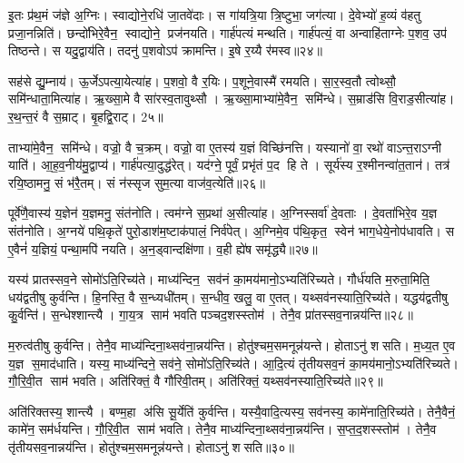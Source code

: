 इ॒तः प्र॑थ॒मं ज॑ज्ञे अ॒ग्निः। स्वाद्योने॒रधि॑ जा॒तवे॑दाः। स गा॑यत्रि॒या त्रि॒ष्टुभा॒ जग॑त्या। दे॒वेभ्यो॑ ह॒व्यं व॑हतु प्रजा॒नन्निति॑। छन्दो॑भिरे॒वैन॒ स्वाद्योने॒ प्रज॑नयति। गार्\mbox{}ह॑पत्यं मन्थति। गार्\mbox{}ह॑पत्यं॒ वा अन्वाहि॑ताग्नेः प॒शव॒ उप॑ तिष्ठन्ते। स यदु॒द्वाय॑ति। तदनु॑ प॒शवोऽप॑ क्रामन्ति। इ॒षे र॒य्यै र॑मस्व॥२४॥

सह॑से द्यु॒म्नाय॑। ऊ॒र्जेऽपत्या॒येत्या॑ह। प॒शवो॒ वै र॒यिः। प॒शूने॒वास्मै॑ रमयति। सा॒र॒स्व॒तौ त्वोथ्सौ॒ समि॑न्धाता॒मित्या॑ह। ऋ॒ख्सा॒मे वै सा॑रस्व॒तावुथ्सौ। ऋ॒ख्सा॒माभ्या॑मे॒वैन॒ समि॑न्धे। स॒म्राड॑सि वि॒राड॒सीत्या॑ह। र॒थ॒न्त॒रं वै स॒म्राट्। बृ॒हद्वि॒राट्। 2५॥

ताभ्या॑मे॒वैन॒ समि॑न्धे। वज्रो॒ वै च॒क्रम्। वज्रो॒ वा ए॒तस्य॑ य॒ज्ञं विच्छि॑नत्ति। यस्यानो॑ वा॒ रथो॑ वाऽन्त॒राऽग्नी याति॑। आ॒ह॒व॒नीय॑मु॒द्वाप्य॑। गार्\mbox{}ह॑पत्या॒दुद्ध॑रेत्। यद॑ग्ने॒ पूर्वं॒ प्रभृ॑तं प॒द हि ते। सूर्य॑स्य र॒श्मीनन्वा॑त॒तान॑। तत्र॑ रयि॒ष्ठामनु॒ सं भ॑रै॒तम्। सं न॑स्सृज सुम॒त्या वाज॑व॒त्येति॑॥२६॥

पूर्वे॑णै॒वास्य॑ य॒ज्ञेन॑ य॒ज्ञमनु॒ संत॑नोति। त्वम॑ग्ने स॒प्रथा॑ अ॒सीत्या॑ह। अ॒ग्निस्सर्वा॑ दे॒वताः। दे॒वता॑भिरे॒व य॒ज्ञ संत॑नोति। अ॒ग्नये॑ पथि॒कृते॑ पुरो॒डाश॑म॒ष्टाक॑पालं॒ निर्व॑पेत्। अ॒ग्निमे॒व प॑थि॒कृत॒ स्वेन॑ भाग॒धेये॒नोप॑धावति। स ए॒वैनं॑ य॒ज्ञियं॒ पन्था॒मपि॑ नयति। अ॒न॒ड्वान्दक्षि॑णा। व॒ही ह्ये॑ष समृ॑द्ध्यै॥२७॥

यस्य॑ प्रातस्सव॒ने सोमो॑ऽति॒रिच्य॑ते। माध्य॑न्दिन॒ सव॑नं का॒मय॑मानो॒ऽभ्यति॑रिच्यते। गौर्ध॑यति म॒रुता॒मिति॒ धय॑द्वतीषु कुर्वन्ति। हि॒नस्ति॒ वै स॒न्ध्यधी॑तम्। स॒न्धीव॒ खलु॒ वा ए॒तत्। यथ्सव॑नस्याति॒रिच्य॑ते। यद्धय॑द्वतीषु कु॒र्वन्ति॑। स॒न्धेश्शान्त्यै। गा॒य॒त्र साम॑ भवति पञ्चद॒शस्स्तोम॑। तेनै॒व प्रा॑तस्सव॒नान्नय॑न्ति॥२८॥

म॒रुत्व॑तीषु कुर्वन्ति। तेनै॒व माध्य॑न्दिना॒थ्सव॑ना॒न्नय॑न्ति। होतु॑श्चम॒समनून्न॑यन्ते। होताऽनु॑ शसति। म॒ध्य॒त ए॒व य॒ज्ञ स॒माद॑धाति। यस्य॒ माध्य॑न्दिने॒ सव॑ने॒ सोमो॑ऽति॒रिच्य॑ते। आ॒दि॒त्यं तृ॑तीयसव॒नं का॒मय॑मानो॒ऽभ्यति॑रिच्यते। गौ॒रि॒वी॒त साम॑ भवति। अति॑रिक्तं॒ वै गौ॑रिवी॒तम्। अति॑रिक्तं॒ यथ्सव॑नस्याति॒रिच्य॑ते॥२९॥

अति॑रिक्तस्य॒ शान्त्यै। बण्म॒हा अ॑सि सू॒र्येति॑ कुर्वन्ति। यस्यै॒वादि॒त्यस्य॒ सव॑नस्य॒ कामे॑नाति॒रिच्य॑ते। तेनै॒वैनं॒ कामे॑न॒ सम॑र्धयन्ति। गौ॒रि॒वी॒त साम॑ भवति। तेनै॒व माध्य॑न्दिना॒थ्सव॑ना॒न्नय॑न्ति। स॒प्त॒द॒शस्स्तोम॑। तेनै॒व तृ॑तीयसव॒नान्नय॑न्ति। होतु॑श्चम॒समनून्न॑यन्ते। होताऽनु॑ शसति॥३०॥

